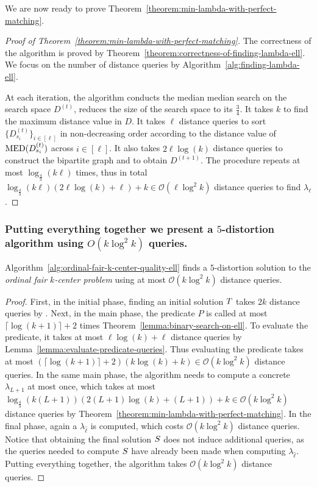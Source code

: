 \documentclass{article}
\newcommand{\bigO}{\ensuremath{\mathcal{O}}\xspace}
\begin{document}
We are now ready to prove Theorem~\ref{theorem:min-lambda-with-perfect-matching}.

\begin{proof}[Proof of Theorem~\ref{theorem:min-lambda-with-perfect-matching}]
    The correctness of the algorithm is proved by Theorem~\ref{theorem:correctness-of-finding-lambda-ell}.
    We focus on the number of distance queries by Algorithm~\ref{alg:finding-lambda-ell}.

    At each iteration, the algorithm conducts the median median search on the search space $D^{(t)}$, reduces the size of the search space to its $\frac{3}{4}$. 
    It takes $k$ to find the maximum distance value in $D$.
    It takes $\ell$ distance queries to sort $\{D_{s_i}^{(t)}\}_{i \in [\ell]}$ in non-decreasing order according to the distance value of $\operatorname{MED}(D_{s_i}^{(t)})$ across $i \in [\ell]$.
    It also takes $2 \ell \log(k)$ distance queries to construct the bipartite graph and to obtain $D^{(t+1)}$. 
    The procedure repeats at most $\log_{\frac{4}{3}} (k \ell)$ times, thus in total $\log_{\frac{4}{3}}(k \ell) (2 \ell \log(k) + \ell) + k \in \bigO(\ell \log^2 k)$ distance queries to find $\lambda_{\ell}$.
\end{proof}
\subsubsection*{Putting everything together we present a $5$-distortion algorithm using $O(k \log^2 k)$ queries.}
\label{sec:putting-everything-together}

\begin{theorem}
    \label{theorem:putting-everything-together} 
    Algorithm~\ref{alg:ordinal-fair-k-center-quality-ell} finds a $5$-distortion solution to the \emph{ordinal fair $k$-center problem} using at most $\bigO(k \log^2 k)$ distance queries.
\end{theorem}
\begin{proof}
    First, in the initial phase, finding an initial solution $T$ takes $2k$ distance queries by .
    Next, in the main phase, the predicate $P$ is called at most $\lceil \log(k + 1) \rceil + 2$ times  Theorem~\ref{lemma:binary-search-on-ell}. 
    To evaluate the predicate, it takes at most $\ell \log(k) + \ell$ distance queries by Lemma~\ref{lemma:evaluate-predicate-queries}. 
    Thus evaluating the predicate takes at most $(\lceil \log(k+1) \rceil + 2) (k \log(k) + k) \in \bigO(k \log^2 k)$ distance queries. 
    In the same main phase, the algorithm needs to compute a concrete $\lambda_{L+1}$ at most once, which takes at most $\log_{\frac{4}{3}}(k (L+1)) (2 (L+1) \log(k) + (L+1)) + k \in \bigO(k \log^2 k)$ distance queries by Theorem~\ref{theorem:min-lambda-with-perfect-matching}.
    In the final phase, again a $\lambda_{\hat{\ell}}$ is computed,  which costs $\bigO(k \log^2 k)$ distance queries. 
    Notice that obtaining the final solution $S$ does not induce additional queries, as the queries needed to compute $S$ have already been made when computing $\lambda_{\hat{\ell}}$. 
    Putting everything together, the algorithm takes $\bigO(k \log^2 k)$ distance queries. 
\end{proof}
\end{document}
